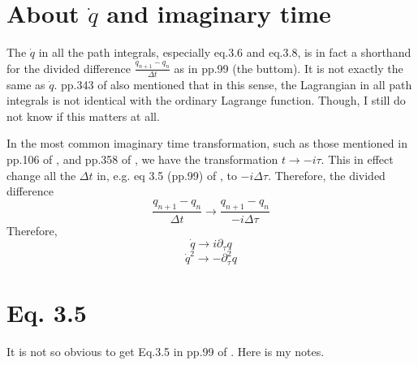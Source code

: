\documentclass{article}
\begin{document}
\section{About \texorpdfstring{$\dot{q}$}{} and imaginary time}

The $\dot{q}$ in all the path integrals, especially eq.3.6 and eq.3.8, is in
fact a shorthand for the divided difference $\frac{q_{n+1}-q_n}{\Delta t}$ as in
pp.99 (the buttom). It is not exactly the same as $\dot{q}$. pp.343 of
\cite{Greiner1996} also mentioned that in this sense, the Lagrangian in all
path integrals is not identical with the ordinary Lagrange function. Though, I
still do not know if this matters at all.

In the most common imaginary time transformation, such as those mentioned in
pp.106 of \cite{Altland2010}, and pp.358 of \cite{Greiner1996}, we have the
transformation $t\to -i\tau$. This in effect change all the $\Delta t$ in, e.g.
eq 3.5 (pp.99) of \cite{Altland2010}, to $-i\Delta\tau$. Therefore, the divided
difference
$$ \frac{q_{n+1}-q_n}{\Delta t} \to \frac{q_{n+1}-q_n}{-i \Delta\tau}$$
Therefore,
$$ \dot{q} \to i\partial_\tau q $$
$$ \dot{q}^2 \to -\partial^2_\tau q $$
\section{Eq. 3.5}

It is not so obvious to get Eq.3.5 in pp.99 of \cite{Altland2010}. Here is my
notes.
\end{document}

